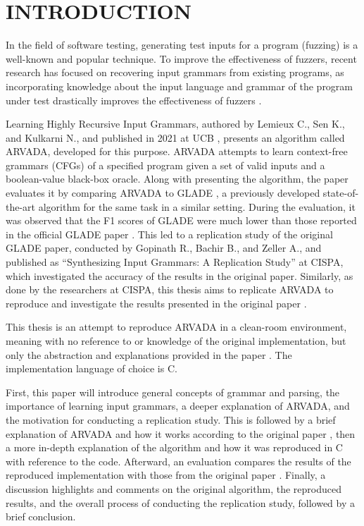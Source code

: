 \chapter{INTRODUCTION}

In the field of software testing, generating test inputs for a program (fuzzing) is a well-known and popular technique. To improve the effectiveness of fuzzers, recent research has focused on recovering input grammars from existing programs, as incorporating knowledge about the input language and grammar of the program under test drastically improves the effectiveness of fuzzers \cite{gopinathBuildingFastFuzzers2019}.

\vspace{\baselineskip}
Learning Highly Recursive Input Grammars, authored by Lemieux C., Sen K., and Kulkarni N., and published in 2021 at UCB \cite{kulkarniLearningHighlyRecursive2021}, presents an algorithm called ARVADA, developed for this purpose. ARVADA attempts to learn context-free grammars (CFGs) of a specified program given a set of valid inputs and a boolean-value black-box oracle. Along with presenting the algorithm, the paper evaluates it by comparing ARVADA to GLADE \cite{bastaniSynthesizingProgramInput}, a previously developed state-of-the-art algorithm for the same task in a similar setting.
During the evaluation, it was observed that the F1 scores of GLADE were much lower than those reported in the official GLADE paper \cite{bastaniSynthesizingProgramInput}. This led to a replication study of the original GLADE paper, conducted by Gopinath R., Bachir B., and Zeller A., and published as “Synthesizing Input Grammars: A Replication Study” \cite{bendrissouSynthesizingInputGrammars2022} at CISPA, which investigated the accuracy of the results in the original paper. Similarly, as done by the researchers at CISPA, this thesis aims to replicate ARVADA to reproduce and investigate the results presented in the original paper \cite{kulkarniLearningHighlyRecursive2021}.

\vspace{\baselineskip}
This thesis is an attempt to reproduce ARVADA in a clean-room environment, meaning with no reference to or knowledge of the original implementation, but only the abstraction and explanations provided in the paper \cite{kulkarniLearningHighlyRecursive2021}. The implementation language of choice is C.

\vspace{\baselineskip}
First, this paper will introduce general concepts of grammar and parsing, the importance of learning input grammars, a deeper explanation of ARVADA, and the motivation for conducting a replication study. This is followed by a brief explanation of ARVADA and how it works according to the original paper \cite{kulkarniLearningHighlyRecursive2021}, then a more in-depth explanation of the algorithm and how it was reproduced in C with reference to the code. Afterward, an evaluation compares the results of the reproduced implementation with those from the original paper \cite{kulkarniLearningHighlyRecursive2021}. Finally, a discussion highlights and comments on the original algorithm, the reproduced results, and the overall process of conducting the replication study, followed by a brief conclusion.

